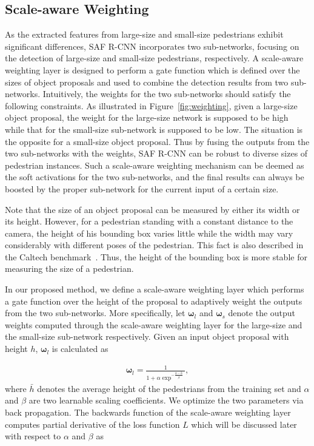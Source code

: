 \documentclass[journal]{IEEEtran}
\begin{document}
\subsection{Scale-aware Weighting}\label{sec:weight}
As the extracted features from large-size and small-size pedestrians exhibit significant differences, SAF R-CNN incorporates two sub-networks, focusing on the detection of large-size and small-size pedestrians, respectively. A scale-aware weighting layer is designed to perform a gate function which is defined over the sizes of object proposals and used to combine the detection results from two sub-networks. Intuitively, the weights for the two sub-networks should satisfy the following constraints. As illustrated in Figure~\ref{fig:weighting}, given a large-size object proposal, the weight for the large-size network is supposed to be high while that for the small-size sub-network is supposed to be low. The situation is the opposite for a small-size object proposal. Thus by fusing the outputs from the two sub-networks with the weights, SAF R-CNN can be robust to diverse sizes of pedestrian instances. Such a scale-aware weighting mechanism can be deemed as the soft activations for the two sub-networks, and the final results can always be boosted by the proper sub-network for the current input of a certain size.



Note that the size of an object proposal can be measured by either its width or its height. However, for a pedestrian standing with a constant distance to the camera, the height of his bounding box varies little while the width may vary considerably with different poses of the pedestrian. This fact is also described in the Caltech benchmark~\cite{dollar2012pedestrian}. Thus, the height of the bounding box is more stable for measuring the size of a pedestrian. 

In our proposed method, we define a scale-aware weighting layer which performs a gate function over the height of the proposal to adaptively weight the outputs from the two sub-networks. More specifically, let $\boldsymbol{\omega}_l$ and $\boldsymbol{\omega}_s$ denote the output weights computed through the scale-aware weighting layer for the large-size and the small-size sub-network respectively. Given an input object proposal with height $h$, $\boldsymbol{\omega}_l$ is calculated as

\begin{equation}
	\begin{aligned}
		\boldsymbol{\omega}_l = \frac{1}{1 + \alpha \exp^{-\frac{h - \bar{h}}{\beta}}},
		\label{eq:weights_l}
	\end{aligned}
\end{equation}
where $\bar{h}$ denotes the average height of the pedestrians from the training set and $\alpha$ and $\beta$ are two learnable scaling coefficients. We optimize the two parameters via back propagation. The backwards function of the scale-aware weighting layer  computes partial derivative of the loss function $L$ which will be discussed later with respect to $\alpha$ and $\beta$ as
\end{document}
